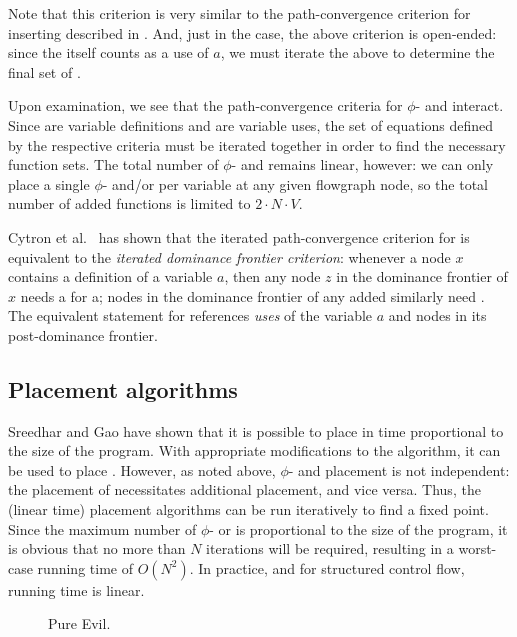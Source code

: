 Note that this criterion is very similar to the path-con\-ver\-gence
criterion for inserting  described in
\cite{appel:modern,cytron91:ssa}.  And, just in the \phifunction{}
case, the above criterion is open-ended: since the \sigfunction{}
itself counts as a use of $a$, we must iterate the above to determine
the final set of .

Upon examination, we see that the path-con\-ver\-gence criteria for $\phi$- and
 interact.  Since  are variable
definitions and  are variable uses, the set of
equations defined by the respective criteria must be iterated together 
in order to find the necessary function sets.  The total number of
$\phi$- and  remains linear, however: we can only place 
a single $\phi$- and/or \sigfunction{} per variable at any given
flowgraph node, so the total number of added functions is limited to 
$2 \cdot N \cdot V$.

Cytron et al.\ \cite{cytron91:ssa} has shown that the iterated
path-con\-ver\-gence criterion for  is equivalent to the
\textit{iterated dominance frontier criterion}: whenever a node $x$
contains a definition of a variable $a$, then any node $z$ in the
dominance frontier of $x$ needs a \phifunction{} for a; nodes in the
dominance frontier of any added \phifunction{} similarly need
.  The equivalent statement for 
references \textit{uses} of the variable $a$ and nodes in its
post-dominance frontier. 

\subsection{Placement algorithms}
Sreedhar and Gao have shown \cite{sreedhar95:lintime} that it is
possible to place  in time proportional to the size of
the program.  With appropriate modifications to the algorithm, it can
be used to place .  However, as noted above, $\phi$-
and \sigfunction{} placement is not independent: the placement of
 necessitates additional \sigfunction{} placement, and
vice versa.  Thus, the (linear time) placement algorithms can be run
iteratively to find a fixed point.  Since the maximum number of
$\phi$- or  is proportional to the size of the program,
it is obvious that no more than $N$ iterations will be required,
resulting in a worst-case running time of $O(N^2)$.  In practice, and
for structured control flow, running time is linear.

\begin{figure}
\begin{center}

\end{center}
\caption{Pure Evil.}
\end{figure}
